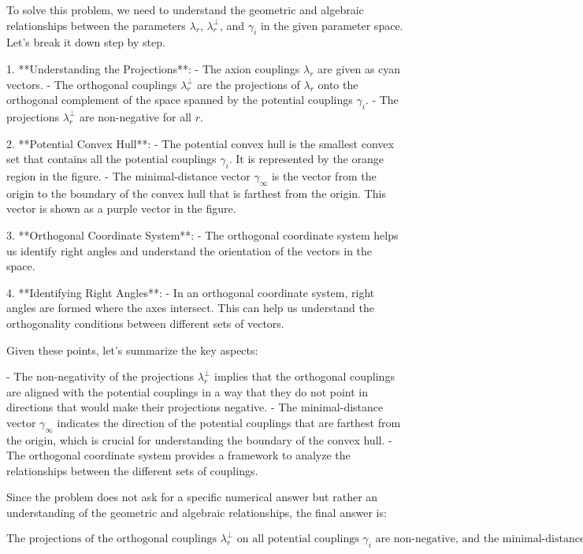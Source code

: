 To solve this problem, we need to understand the geometric and algebraic relationships between the parameters \(\lambda_r\), \(\lambda^\perp_r\), and \(\gamma_i\) in the given parameter space. Let's break it down step by step.

1. **Understanding the Projections**:
   - The axion couplings \(\lambda_r\) are given as cyan vectors.
   - The orthogonal couplings \(\lambda^\perp_r\) are the projections of \(\lambda_r\) onto the orthogonal complement of the space spanned by the potential couplings \(\gamma_i\).
   - The projections \(\lambda^\perp_r\) are non-negative for all \(r\).

2. **Potential Convex Hull**:
   - The potential convex hull is the smallest convex set that contains all the potential couplings \(\gamma_i\). It is represented by the orange region in the figure.
   - The minimal-distance vector \(\gamma_\infty\) is the vector from the origin to the boundary of the convex hull that is farthest from the origin. This vector is shown as a purple vector in the figure.

3. **Orthogonal Coordinate System**:
   - The orthogonal coordinate system helps us identify right angles and understand the orientation of the vectors in the space.

4. **Identifying Right Angles**:
   - In an orthogonal coordinate system, right angles are formed where the axes intersect. This can help us understand the orthogonality conditions between different sets of vectors.

Given these points, let's summarize the key aspects:

- The non-negativity of the projections \(\lambda^\perp_r\) implies that the orthogonal couplings are aligned with the potential couplings in a way that they do not point in directions that would make their projections negative.
- The minimal-distance vector \(\gamma_\infty\) indicates the direction of the potential couplings that are farthest from the origin, which is crucial for understanding the boundary of the convex hull.
- The orthogonal coordinate system provides a framework to analyze the relationships between the different sets of couplings.

Since the problem does not ask for a specific numerical answer but rather an understanding of the geometric and algebraic relationships, the final answer is:

\[
\boxed{\text{The projections of the orthogonal couplings \(\lambda^\perp_r\) on all potential couplings \(\gamma_i\) are non-negative, and the minimal-distance vector \(\gamma_\infty\) indicates the direction of the potential couplings that are farthest from the origin.}}
\]
